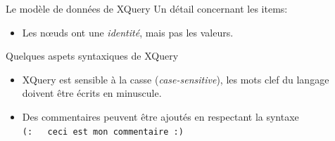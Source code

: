 \begin{frame}[allowframebreaks,t]{Le modèle de données de XQuery}
Un détail concernant les items:

\begin{itemize}
\item Les n{\oe}uds ont une \textit{identité}, mais pas les valeurs. 
\end{itemize}

\end{frame}


\begin{frame}{Quelques aspets syntaxiques de XQuery}

\begin{itemize}
\item XQuery est sensible à la casse (\textit{case-sensitive}), les mots clef du langage doivent être écrits en minuscule.
\item Des commentaires peuvent être ajoutés en respectant la syntaxe\\ \lstinline?(:   ceci est mon commentaire :)?
\end{itemize}

\end{frame}



